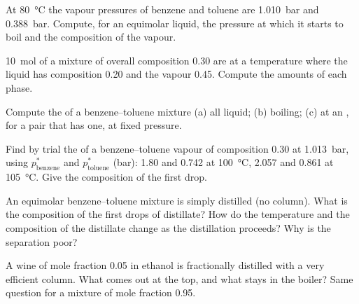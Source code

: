 \begin{exercise}[$\star$]\label{exo:b2:liquid-vapour-diagrams:2}
At \qty{80}{\degreeCelsius} the vapour pressures of benzene and toluene are
\qty{1.010}{bar} and \qty{0.388}{bar}. Compute, for an equimolar liquid, the
pressure at which it starts to boil and the composition of the vapour.
\end{exercise}

\begin{exercise}[$\star$]\label{exo:b2:liquid-vapour-diagrams:3}
\qty{10}{mol} of a mixture of overall composition 0.30 are at a temperature
where the liquid has composition 0.20 and the vapour 0.45. Compute the amounts
of each phase.
\end{exercise}

\begin{exercise}[$\star$]\label{exo:b2:liquid-vapour-diagrams:4}
Compute the  of a benzene--toluene mixture (a) all liquid; (b)
boiling; (c) at an , for a pair that has one, at fixed pressure.
\end{exercise}

\begin{exercise}[$\star\star$]\label{exo:b2:liquid-vapour-diagrams:5}
Find by trial the  of a benzene--toluene vapour of composition 0.30 at
\qty{1.013}{bar}, using $p^*_{\text{benzene}}$ and $p^*_{\text{toluene}}$
(\unit{bar}): 1.80 and 0.742 at \qty{100}{\degreeCelsius}, 2.057 and 0.861 at
\qty{105}{\degreeCelsius}. Give the composition of the first drop.
\end{exercise}

\begin{exercise}[$\star\star$]\label{exo:b2:liquid-vapour-diagrams:6}
An equimolar benzene--toluene mixture is simply distilled (no column). What is
the composition of the first drops of distillate? How do the temperature and
the composition of the distillate change as the distillation proceeds? Why is
the separation poor?
\end{exercise}

\begin{exercise}[$\star\star$]\label{exo:b2:liquid-vapour-diagrams:7}
A wine of mole fraction 0.05 in ethanol is fractionally distilled with a very
efficient column. What comes out at the top, and what stays in the boiler?
Same question for a mixture of mole fraction 0.95.
\end{exercise}

